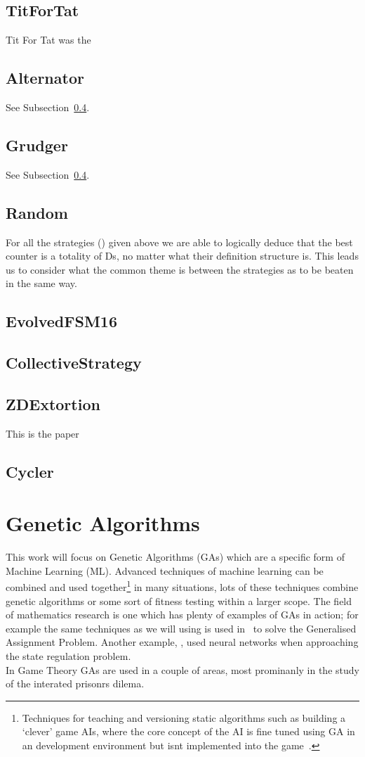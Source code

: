 \subsection{TitForTat}\label{subsec:titfortat}
Tit For Tat was the
\subsection{Alternator}\label{subsec:alternator}
See Subsection~\ref{subsec:random}.
\subsection{Grudger}\label{subsec:grudger}
See Subsection~\ref{subsec:random}.
\subsection{Random}\label{subsec:random}

For all the strategies () given above we are able to logically deduce that the best counter is a totality of Ds, no matter what their definition structure is.
This leads us to consider what the common theme is between the strategies as to be beaten in the same way.



\subsection{EvolvedFSM16}\label{subsec:evolvedFSM16}
\subsection{CollectiveStrategy}\label{subsec:collectiveStrategy}
\subsection{ZDExtortion}\label{subsec:zdExtortion}
This is the paper~\cite{press2012iterated}
\subsection{Cycler}\label{subsec:cycler}

\section{Genetic Algorithms}
This work will focus on Genetic Algorithms (GAs) which are a specific form of Machine Learning (ML).
Advanced techniques of machine learning can be combined and used together\footnote{Techniques for teaching and versioning static algorithms such as building a `clever' game AIs, where the core concept of the AI is fine tuned using GA in an development environment but isnt implemented into the game~\cite{bakkes2009rapid}.} in many situations, lots of these techniques combine genetic algorithms or some sort of fitness testing within a larger scope.
The field of mathematics research is one which has plenty of examples of GAs in action;
for example the same techniques as we will using is used in~\cite{chu1997genetic} to solve the Generalised Assignment Problem.
Another example, \cite{bhanu1995adaptive}, used neural networks when approaching the state regulation problem.\\

In Game Theory GAs are used in a couple of areas, most prominanly in the study of the interated prisonrs dilema.